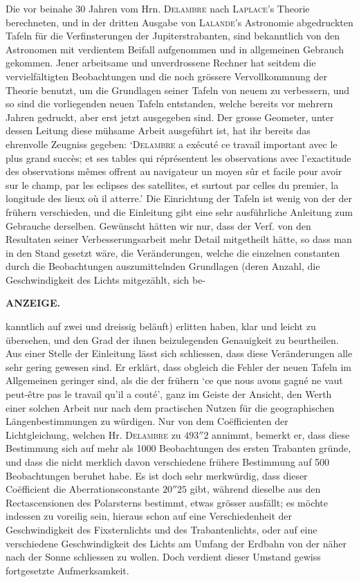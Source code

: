 Die vor beinahe 30 Jahren vom Hrn. \textsc{Delambre} nach \textsc{Laplace}'s Theorie berechneten, und in der dritten Ausgabe von \textsc{Lalande}'s Astronomie abgedruckten Tafeln für die Verfinsterungen der Jupiterstrabanten, sind bekanntlich von den Astronomen mit verdientem Beifall aufgenommen und in allgemeinen Gebrauch gekommen. Jener arbeitsame und unverdrossene Rechner hat seitdem die vervielfältigten Beobachtungen und die noch grössere Vervollkommnung der Theorie benutzt, um die Grundlagen seiner Tafeln von neuem zu verbessern, und so sind die vorliegenden neuen Tafeln entstanden, welche bereits vor mehrern Jahren gedruckt, aber erst jetzt ausgegeben sind. Der grosse Geometer, unter dessen Leitung diese mühsame Arbeit ausgeführt ist, hat ihr bereits das ehrenvolle Zeugniss gegeben: `\textsc{Delambre} a exécuté ce travail important avec le plus grand succès; et ses tables qui réprésentent les observations avec l'exactitude des observations mêmes offrent au navigateur un moyen sûr et facile pour avoir sur le champ, par les eclipses des satellites, et surtout par celles du premier, la longitude des lieux où il atterre.' Die Einrichtung der Tafeln ist wenig von der der frühern verschieden, und die Einleitung gibt eine sehr ausführliche Anleitung zum Gebrauche derselben. Gewünscht hätten wir nur, dass der Verf. von den Resultaten seiner Verbesserungsarbeit mehr Detail mitgetheilt hätte, so dass man in den Stand gesetzt wäre, die Veränderungen, welche die einzelnen constanten durch die Beobachtungen auszumittelnden Grundlagen (deren Anzahl, die Geschwindigkeit des Lichts mitgezählt, sich be-\par
\clearpage
\thispagestyle{empty}
\noindent{}%
%
\parbox[t]{\dimexpr\linewidth-24mm\relax}{\centering\footnotesize\bfseries ANZEIGE.\par}%
\makebox[12mm][r]{}\par\medskip
\noindent kanntlich auf zwei und dreissig beläuft) erlitten haben, klar und leicht zu übersehen, und den Grad
der ihnen beizulegenden Genauigkeit zu beurtheilen. Aus einer Stelle der Einleitung lässt sich schliessen,
dass diese Veränderungen alle sehr gering gewesen sind. Er erklärt, dass obgleich die Fehler der neuen
Tafeln im Allgemeinen geringer sind, als die der frühern `ce que nous avons gagné ne vaut peut-être
pas le travail qu'il a couté', ganz im Geiste der Ansicht, den Werth einer solchen Arbeit nur nach
dem practischen Nutzen für die geographischen Längenbestimmungen zu würdigen. Nur von dem Coëfficienten
der Lichtgleichung, welchen Hr. \textsc{Delambre} zu $493''2$ annimmt, bemerkt er, dass diese Bestimmung
sich auf mehr als 1000 Beobachtungen des ersten Trabanten gründe, und dass die nicht merklich
davon verschiedene frühere Bestimmung auf 500 Beobachtungen beruhet habe. Es ist doch sehr merkwürdig,
dass dieser Coëfficient die Aberrationsconstante $20''25$ gibt, während dieselbe aus den Rectascensionen
des Polarsterns bestimmt, etwas grösser ausfällt; es möchte indessen zu voreilig sein, hieraus
schon auf eine Verschiedenheit der Geschwindigkeit des Fixsternlichts und des Trabantenlichts, oder
auf eine verschiedene Geschwindigkeit des Lichts am Umfang der Erdbahn von der näher nach der
Sonne schliessen zu wollen. Doch verdient dieser Umstand gewiss fortgesetzte Aufmerksamkeit.
